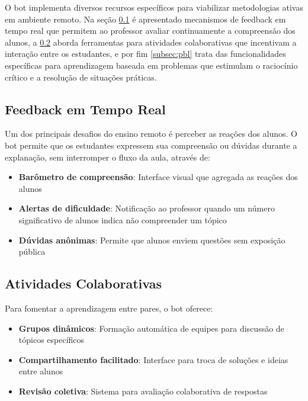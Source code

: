 O bot implementa diversos recursos específicos para viabilizar metodologias ativas em ambiente remoto. Na seção \ref{subsec:feedback} é apresentado mecanismos de feedback em tempo real que permitem ao professor avaliar continuamente a compreensão dos alunos, a \ref{subsec:colaboracao} aborda ferramentas para atividades colaborativas que incentivam a interação entre os estudantes, e por fim \ref{subsec:pbl} trata das funcionalidades específicas para aprendizagem baseada em problemas que estimulam o raciocínio crítico e a resolução de situações práticas.


\subsection{Feedback em Tempo Real}
\label{subsec:feedback}

Um dos principais desafios do ensino remoto é perceber as reações dos alunos. O bot permite que os estudantes expressem sua compreensão ou dúvidas durante a explanação, sem interromper o fluxo da aula, através de:

\begin{itemize}
\item \textbf{Barômetro de compreensão}: Interface visual que agregada as reações dos alunos
\item \textbf{Alertas de dificuldade}: Notificação ao professor quando um número significativo de alunos indica não compreender um tópico
\item \textbf{Dúvidas anônimas}: Permite que alunos enviem questões sem exposição pública
\end{itemize}


\subsection{Atividades Colaborativas}
\label{subsec:colaboracao}

Para fomentar a aprendizagem entre pares, o bot oferece:

\begin{itemize}
\item \textbf{Grupos dinâmicos}: Formação automática de equipes para discussão de tópicos específicos
\item \textbf{Compartilhamento facilitado}: Interface para troca de soluções e ideias entre alunos
\item \textbf{Revisão coletiva}: Sistema para avaliação colaborativa de respostas
\end{itemize}

